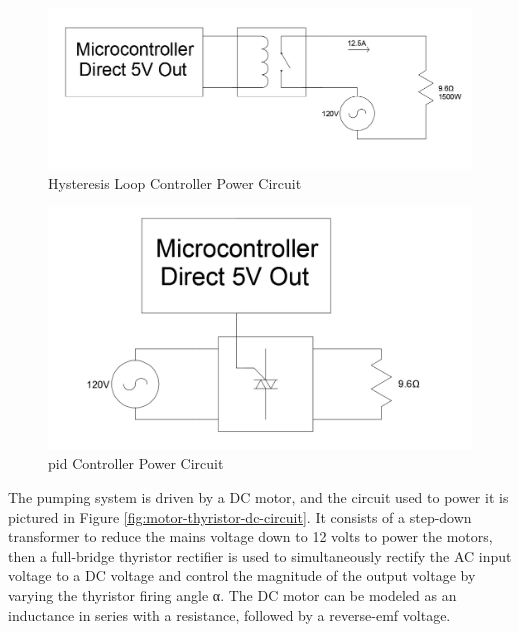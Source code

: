 \documentclass{article}
\begin{document}
\begin{figure}[H]
\begin{center}
\includegraphics[scale=0.40]{heater-hysteresis-circuit.png}
\caption{Hysteresis Loop Controller Power Circuit}
\label{fig:heater-hysteresis-circuit}
\end{center}
\end{figure}

\begin{figure}[H]
\begin{center}
\includegraphics[scale=0.30]{heater-pid-circuit.png}
\caption{\gls{pid} Controller Power Circuit}
\label{fig:heater-pid-circuit}
\end{center}
\end{figure}

\noindent The pumping system is driven by a DC motor, and the circuit used to power it is pictured in Figure \ref{fig:motor-thyristor-dc-circuit}. It consists of a step-down transformer to reduce the mains voltage down to 12 volts to power the motors, then a full-bridge thyristor rectifier is used to simultaneously rectify the AC input voltage to a DC voltage and control the magnitude of the output voltage by varying the thyristor firing angle α. The DC motor can be modeled as an inductance in series with a resistance, followed by a reverse-emf voltage.
\end{document}
